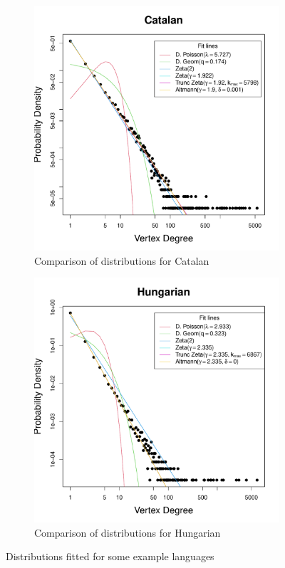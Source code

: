 \documentclass{article}
\begin{document}
\begin{figure}[h]
    \centering 
    \begin{subfigure}[b]{0.44\textwidth}
         \centering
         \includegraphics[width=\textwidth]{figures/Catalan_fit.pdf}
         \caption{Comparison of distributions for Catalan}
        \label{fig:cat_fit}
     \end{subfigure}
     \hfill
    \begin{subfigure}[b]{0.44\textwidth}
         \centering
         \includegraphics[width=\textwidth]{figures/Hungarian_fit.pdf}
         \caption{Comparison of distributions for Hungarian}
         \label{fig:hun_fit}
     \end{subfigure}
     \caption{Distributions fitted for  some example languages}
\end{figure}
\end{document}

